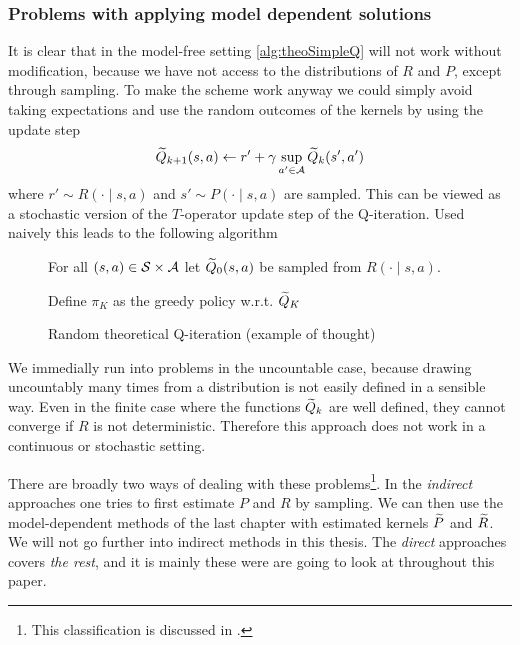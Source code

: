 \subsubsection{Problems with applying model dependent solutions}

It is clear that in the model-free setting
\cref{alg:theoSimpleQ} will not work without
modification, because we have not access to the distributions
of $R$ and $P$, except through sampling.
To make the scheme work anyway we could simply avoid taking expectations
and use the random outcomes of the kernels
by using the update step
\[ \widetilde{Q}_{k+1}(s, a) \leftarrow
r' + \gamma \sup_{a' \in \mathcal{A}} \widetilde{Q}_k(s', a') \]
where $r' \sim R(\cdot \mid s, a)$ and $s' \sim P(\cdot \mid s, a)$ are
sampled.
This can be viewed as a stochastic version of the $T$-operator
update step of the Q-iteration.
Used naively this leads to the following algorithm

\begin{figure}[H]
\begin{algorithm}[H] %
  \caption{Random theoretical Q-iteration (example of thought)}
For all $(s, a) \in \mathcal{S} \times \mathcal{A}$ let
$\widetilde{Q}_0(s, a)$ be sampled from $R(\cdot \mid s, a)$.

Define $\pi_K$ as the greedy policy w.r.t. $\widetilde{Q}_K$ \\
\label{alg:theoRandomQ}
\end{algorithm}
\end{figure}
We immedially run into problems in the uncountable case, because
drawing uncountably many times from a distribution is not easily
defined in a sensible way.
Even in the finite case where the functions $\widetilde{Q}_k$
are well defined, they cannot converge if $R$ is not deterministic.
Therefore this approach does not work in a continuous or
stochastic setting.

There are broadly two ways of dealing with these
problems\footnote{This classification is discussed in .}.
In the \emph{indirect} approaches one tries to first estimate $P$ and $R$
by sampling.
We can then use the model-dependent methods of the last chapter with
estimated kernels $\widetilde{P}$ and $\widetilde{R}$.
We will not go further into indirect methods in this thesis.
The \emph{direct} approaches covers \emph{the rest},
and it is mainly these were are going to look at throughout this
paper.

